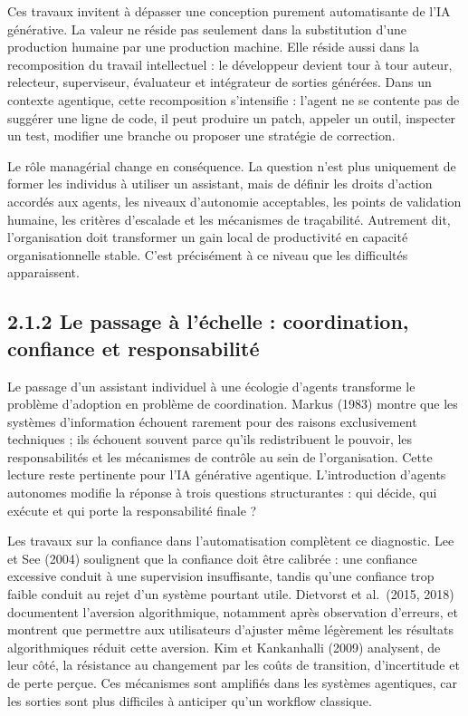 Ces travaux invitent à dépasser une conception purement automatisante de l'IA générative. La valeur ne réside pas seulement dans la substitution d'une production humaine par une production machine. Elle réside aussi dans la recomposition du travail intellectuel : le développeur devient tour à tour auteur, relecteur, superviseur, évaluateur et intégrateur de sorties générées. Dans un contexte agentique, cette recomposition s'intensifie : l'agent ne se contente pas de suggérer une ligne de code, il peut produire un patch, appeler un outil, inspecter un test, modifier une branche ou proposer une stratégie de correction.

Le rôle managérial change en conséquence. La question n'est plus uniquement de former les individus à utiliser un assistant, mais de définir les droits d'action accordés aux agents, les niveaux d'autonomie acceptables, les points de validation humaine, les critères d'escalade et les mécanismes de traçabilité. Autrement dit, l'organisation doit transformer un gain local de productivité en capacité organisationnelle stable. C'est précisément à ce niveau que les difficultés apparaissent.

\subsection{2.1.2 Le passage à l'échelle : coordination, confiance et responsabilité}\label{le-passage-uxe0-luxe9chelle-coordination-confiance-et-responsabilituxe9}

Le passage d'un assistant individuel à une écologie d'agents transforme le problème d'adoption en problème de coordination. Markus (1983) montre que les systèmes d'information échouent rarement pour des raisons exclusivement techniques ; ils échouent souvent parce qu'ils redistribuent le pouvoir, les responsabilités et les mécanismes de contrôle au sein de l'organisation. Cette lecture reste pertinente pour l'IA générative agentique. L'introduction d'agents autonomes modifie la réponse à trois questions structurantes : qui décide, qui exécute et qui porte la responsabilité finale ?

Les travaux sur la confiance dans l'automatisation complètent ce diagnostic. Lee et See (2004) soulignent que la confiance doit être calibrée : une confiance excessive conduit à une supervision insuffisante, tandis qu'une confiance trop faible conduit au rejet d'un système pourtant utile. Dietvorst et al.~(2015, 2018) documentent l'aversion algorithmique, notamment après observation d'erreurs, et montrent que permettre aux utilisateurs d'ajuster même légèrement les résultats algorithmiques réduit cette aversion. Kim et Kankanhalli (2009) analysent, de leur côté, la résistance au changement par les coûts de transition, d'incertitude et de perte perçue. Ces mécanismes sont amplifiés dans les systèmes agentiques, car les sorties sont plus difficiles à anticiper qu'un workflow classique.

